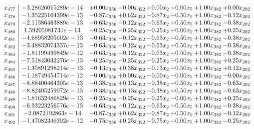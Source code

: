 \documentclass[8pt]{article}
\begin{document}
\[\begin{array}{c| c c@{\hskip 2pt} c@{\hskip 2pt} c@{\hskip 2pt} c@{\hskip 2pt} c@{\hskip 2pt} c@{\hskip 2pt} }
 x_{477}   &  -3.28626015289e-14 & +  0.00 x_{356} & -0.00 x_{322} & +  0.00 x_{2} & +  0.00 x_{5} & +  1.00 x_{382} & +  0.00 x_{202}\\
 x_{478}   &  -1.35225164399e-13 & -0.87 x_{356} & +  0.62 x_{322} & -0.87 x_{2} & +  0.50 x_{5} & +  1.00 x_{382} & -0.12 x_{202}\\
 x_{479}   &  -2.11386463889e-13 & -0.63 x_{356} & -0.12 x_{322} & -0.63 x_{2} & +  0.50 x_{5} & +  1.00 x_{382} & -0.38 x_{202}\\
 x_{480}   &  1.59205981731e-13 & -0.25 x_{356} & -0.25 x_{322} & -0.25 x_{2} & +  0.00 x_{5} & +  1.00 x_{382} & +  0.25 x_{202}\\
 x_{481}   &  -4.68958205602e-13 & -0.63 x_{356} & -0.12 x_{322} & -0.63 x_{2} & +  0.50 x_{5} & +  1.00 x_{382} & -0.38 x_{202}\\
 x_{482}   &  -3.48832074337e-13 & -0.63 x_{356} & -0.12 x_{322} & -0.63 x_{2} & +  0.50 x_{5} & +  1.00 x_{382} & -0.38 x_{202}\\
 x_{483}   &  -1.81199499849e-12 & -0.63 x_{356} & -0.12 x_{322} & -0.63 x_{2} & +  0.50 x_{5} & +  1.00 x_{382} & -0.38 x_{202}\\
 x_{484}   &  -7.51843032276e-13 & -0.25 x_{356} & -0.25 x_{322} & -0.25 x_{2} & -0.00 x_{5} & +  1.00 x_{382} & +  0.25 x_{202}\\
 x_{485}   &  -1.35891298214e-13 & -0.13 x_{356} & +  0.38 x_{322} & -0.13 x_{2} & +  0.50 x_{5} & +  1.00 x_{382} & +  0.12 x_{202}\\
 x_{486}   &  -1.18749454714e-12 & -0.00 x_{356} & +  0.00 x_{322} & -0.00 x_{2} & -0.00 x_{5} & +  1.00 x_{382} & -0.00 x_{202}\\
 x_{487}   &  -8.88400464305e-13 & -0.38 x_{356} & +  0.13 x_{322} & -0.38 x_{2} & +  0.50 x_{5} & +  1.00 x_{382} & -0.63 x_{202}\\
 x_{488}   &  -8.82405259972e-13 & -0.38 x_{356} & +  0.13 x_{322} & -0.38 x_{2} & +  0.50 x_{5} & +  1.00 x_{382} & -0.63 x_{202}\\
 x_{489}   &  -1.81632486829e-13 & -0.25 x_{356} & -0.25 x_{322} & -0.25 x_{2} & -0.00 x_{5} & +  1.00 x_{382} & +  0.25 x_{202}\\
 x_{490}   &  -6.93223256576e-13 & -0.63 x_{356} & -0.12 x_{322} & -0.63 x_{2} & +  0.50 x_{5} & +  1.00 x_{382} & -0.38 x_{202}\\
 x_{491}   &  -2.0872192863e-14 & -0.87 x_{356} & +  0.62 x_{322} & -0.87 x_{2} & +  0.50 x_{5} & +  1.00 x_{382} & -0.12 x_{202}\\
 x_{492}   &  -1.47082346302e-12 & -0.75 x_{356} & +  0.25 x_{322} & -0.75 x_{2} & -0.00 x_{5} & +  1.00 x_{382} & -0.25 x_{202}\\

\end{array}\]
\end{document}
